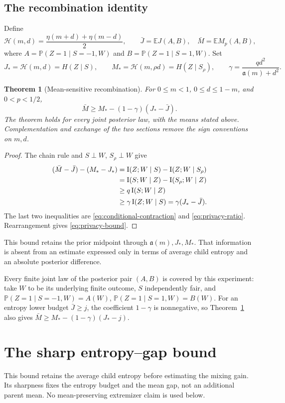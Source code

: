 \documentclass[11pt]{article}
\newtheorem{theorem}{Theorem}[section]
\theoremstyle{remark}\newtheorem{remark}[theorem]{Remark}
\newcommand{\E}{\mathbb E}\newcommand{\PP}{\mathbb P}\newcommand{\dd}{\,\mathrm d}
\newcommand{\privA}{\mathfrak a}\newcommand{\Afun}{\mathscr A}
\numberwithin{equation}{section}
\begin{document}
\subsection{The recombination identity}
Define
\[
\mathcal H(m,d)=\frac{\eta(m+d)+\eta(m-d)}2,\qquad
\bar J=\E J(A,B),\quad \bar M=\E M_p(A,B),
\]
where $A=\PP(Z=1\mid S=-1,W)$ and $B=\PP(Z=1\mid S=1,W)$. Set
\[
J_*=\mathcal H(m,d)=H(Z\mid S),\qquad M_*=\mathcal H(m,\rho d)=H(Z\mid S_\rho),\qquad
\gamma=\frac{q d^2}{\privA(m)+d^2}.
\]
\begin{theorem}[Mean-sensitive recombination]\label{thm:privacy}
For $0\le m<1$, $0\le d\le1-m$, and $0<p<1/2$,
\begin{equation}\label{eq:privacy-bound}
\bar M\ge M_*-(1-\gamma)(J_*-\bar J).
\end{equation}
The theorem holds for every joint posterior law, with the means stated above. Complementation and exchange of the two sections remove the sign conventions on $m,d$.
\end{theorem}
\begin{proof}
The chain rule and $S\perp W$, $S_\rho\perp W$ give
\begin{align*}
(\bar M-\bar J)-(M_*-J_*)
&=\operatorname I(Z;W\mid S)-\operatorname I(Z;W\mid S_\rho)\\
&=\operatorname I(S;W\mid Z)-\operatorname I(S_\rho;W\mid Z)\\
&\ge q\operatorname I(S;W\mid Z)\\
&\ge\gamma\operatorname I(Z;W\mid S)=\gamma(J_*-\bar J).
\end{align*}
The last two inequalities are \eqref{eq:conditional-contraction} and \eqref{eq:privacy-ratio}. Rearrangement gives \eqref{eq:privacy-bound}.
\end{proof}
This bound retains the prior midpoint through $\privA(m),J_*,M_*$. That information is absent from an estimate expressed only in terms of average child entropy and an absolute posterior difference.



Every finite joint law of the posterior pair $(A,B)$ is covered by this
experiment: take $W$ to be its underlying finite outcome, $S$ independently
fair, and $\PP(Z=1\mid S=-1,W)=A(W)$, $\PP(Z=1\mid S=1,W)=B(W)$.
For an entropy lower budget $\bar J\ge j$, the coefficient $1-\gamma$ is
nonnegative, so Theorem~\ref{thm:privacy} also gives
$\bar M\ge M_*-(1-\gamma)(J_*-j)$.
\section{The sharp entropy--gap bound}\label{sec:budget}
This bound retains the average child entropy before estimating the mixing
gain. Its sharpness fixes the entropy budget and the mean gap, not an
additional parent mean. No mean-preserving extremizer claim is used below.
\end{document}
